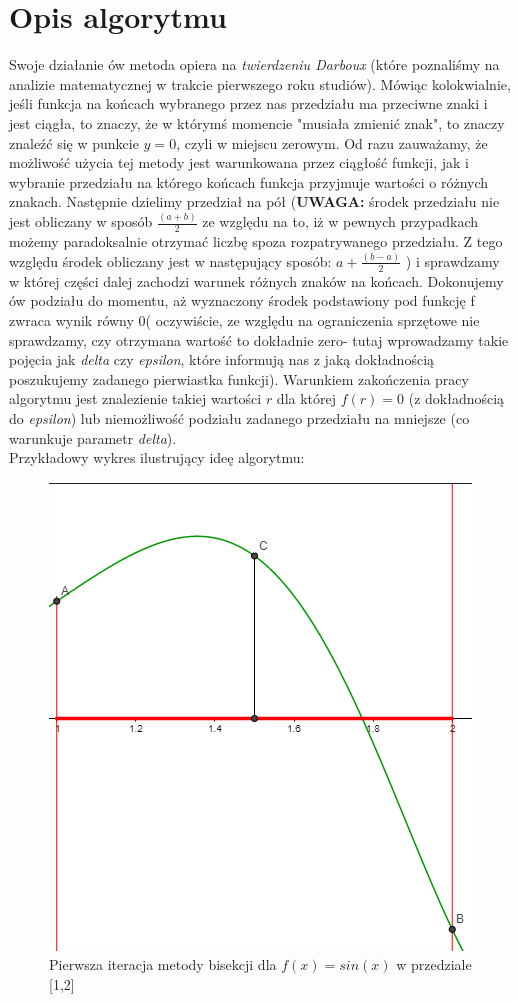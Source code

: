 \documentclass[a4paper,14pt]{report}
\begin{document}
  \section{Opis algorytmu}
  Swoje działanie ów metoda opiera na \textit{twierdzeniu Darboux} (które poznaliśmy na analizie matematycznej w trakcie pierwszego roku studiów). Mówiąc kolokwialnie, jeśli funkcja na końcach wybranego przez nas przedziału ma przeciwne znaki i jest ciągła, to znaczy, że w którymś momencie "musiała zmienić znak", to znaczy znaleźć się w punkcie $y=0$, czyli w miejscu zerowym. Od razu zauważamy, że możliwość użycia tej metody jest warunkowana przez ciągłość funkcji, jak i wybranie przedziału na którego końcach funkcja przyjmuje wartości o różnych znakach. Następnie dzielimy przedział na pół (\textbf{UWAGA: } środek przedziału nie jest obliczany w sposób $\frac{(a+b)}{2}$ ze względu na to, iż w pewnych przypadkach możemy paradoksalnie otrzymać liczbę spoza rozpatrywanego przedziału. Z tego względu środek obliczany jest w następujący sposób: $a+\frac{(b-a)}{2}$ ) i sprawdzamy w której części dalej zachodzi warunek różnych znaków na końcach. Dokonujemy ów podziału do momentu, aż wyznaczony środek podstawiony pod funkcję f zwraca wynik równy 0( oczywiście, ze względu na ograniczenia sprzętowe nie sprawdzamy, czy otrzymana wartość to dokładnie zero- tutaj wprowadzamy takie pojęcia jak \textit{delta} czy \textit{epsilon}, które informują nas z jaką dokładnością poszukujemy zadanego pierwiastka funkcji).
  Warunkiem zakończenia pracy algorytmu jest znalezienie takiej wartości $r$ dla której $f(r)=0$ (z dokładnością do \textit{epsilon}) lub niemożliwość podziału zadanego przedziału na mniejsze (co warunkuje parametr \textit{delta}). \\ 
  Przykładowy wykres ilustrujący ideę algorytmu: 
  \begin{figure}[H]
    \includegraphics[scale=1.0]{zad1a}
    \centering
    \caption{Pierwsza iteracja metody bisekcji dla  $f(x)=sin(x)$ w przedziale [1,2]}
  \end{figure}
\end{document}

